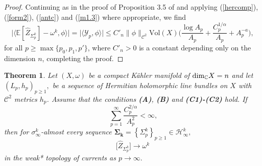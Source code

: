 \documentclass[11pt,leqno,oneside]{amsart}
\newtheorem{thm}{Theorem}[section]
\numberwithin{equation}{section}
\begin{document}
\begin{proof}
	Continuing as in the proof of Proposition 3.5 of \cite{CLMM} and applying (\ref{hercomp}), (\ref{form2}), (\ref{antc}) and (\ref{m1.3}) where appropriate, we find
	\begin{equation*}
		\big| \langle \mathbb{E}[\widehat{Z}_{\Sigma^k_p}] - \omega^k, \phi \rangle \big| = \big| \langle \mathcal{Y}_p, \phi \rangle \big| \leq C'_n \|\phi\|_{\mathscr{C}^2} \mathrm{Vol}(X) \Big( \frac{\log A_p}{A_p} + \frac{C_p^{1/\alpha}}{A_p} + A_p^{-a} \Big),
	\end{equation*}
	for all $p \geq \max\{p_0, p_1, p'\}$, where $C'_n > 0$ is a constant depending only on the dimension $n$, completing the proof.
\end{proof}


\begin{thm}Let $(X,\omega)$  be a compact K\"{a}hler manifold of $\textup{dim}_{\mathbb{C}}X=n$ and let  $(L_{p},h_{p})_{p\geq 1},$ be a sequence of Hermitian holomorphic line bundles on $X$ with $\mathscr{C}^{2}$ metrics $h_{p}$. Assume that the conditions \textbf{(A)}, \textbf{(B)} and \textbf{(C1)-(C2)} hold.  If $$\ \sum_{p=1}^{\infty}\frac{C_{p}^{2/\alpha}}{A_{p}^{2}}< \infty,$$ then for $\sigma_{\infty}^{k}$-almost every sequence $\mathbf{\Sigma_{k}}=\left \{ \Sigma_{p}^{k} \right \} _{p\geq 1} \in \mathcal{H}_{\infty}^{k},$
	\begin{equation*}
		\big[\widehat{Z}_{\Sigma_{p}^{k}}\big]\longrightarrow \omega^k
	\end{equation*}
	in the weak* topology of currents as $p \rightarrow \infty.$
\end{thm}
\end{document}
